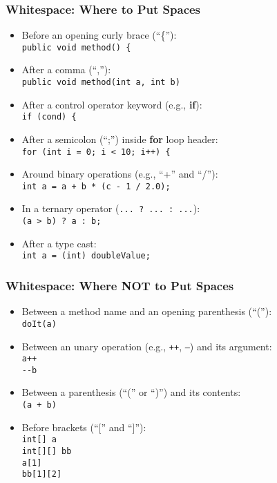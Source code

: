 \documentclass[screen]{beamer}
\begin{document}
\begin{frame}[fragile]
\frametitle{Whitespace: Where to Put Spaces}%
%
\begin{itemize}[<+->]
	\item Before an opening curly brace (``\{''):\\
		\lstinline!public void method() {!
	\item After a comma (``,''):\\
		\lstinline!public void method(int a, int b)!
	\item After a control operator keyword (e.g., {\bf if}):\\
		\lstinline!if (cond) {!
	\item After a semicolon (``;'') inside \textbf{for} loop header:\\
		\lstinline!for (int i = 0; i < 10; i++) {!
	\item Around binary operations (e.g., ``+'' and ``/''):\\
		\lstinline!int a = a + b * (c - 1 / 2.0);!
	\item In a ternary operator (\lstinline!... ? ... : ...!):\\
		\lstinline!(a > b) ? a : b;!
	\item After a type cast:\\
		\lstinline!int a = (int) doubleValue;!
\end{itemize}
\end{frame}

\begin{frame}[fragile]
\frametitle{Whitespace: Where NOT to Put Spaces}%
%
\begin{itemize}[<+->]
	\item Between a method name and an opening parenthesis (``(''):\\
		\lstinline!doIt(a)!
	\item Between an unary operation (e.g., \texttt{++}, \texttt{--}) and its argument:\\
		\lstinline!a++!\\
		\lstinline!--b!\\
	\item Between a parenthesis (``('' or ``)'') and its contents:\\
		\lstinline!(a + b)!
	\item Before brackets (``['' and ``]''):\\
		\lstinline!int[] a!\\
		\lstinline!int[][] bb!\\
		\lstinline!a[1]!\\
		\lstinline!bb[1][2]!
\end{itemize}
\end{frame}
\end{document}
